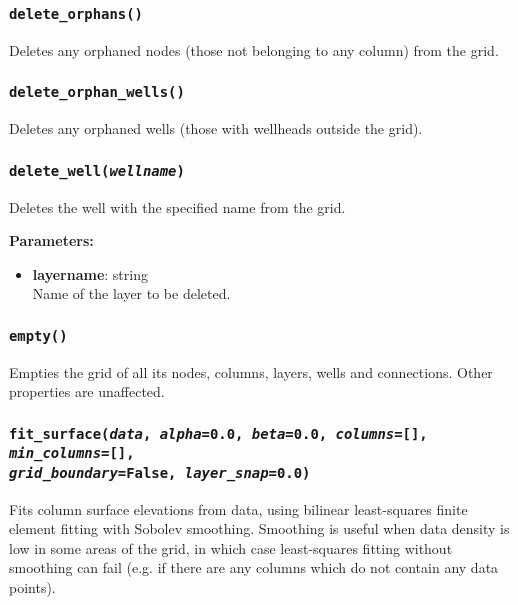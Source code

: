 \subsubsection{\texttt{delete\_orphans()}}

Deletes any orphaned nodes (those not belonging to any column) from the grid.

\subsubsection{\texttt{delete\_orphan\_wells()}}

Deletes any orphaned wells (those with wellheads outside the grid).

\subsubsection{\texttt{delete\_well(\emph{wellname})}}

Deletes the well with the specified name from the grid.

\textbf{Parameters:}
\begin{itemize}
\item \textbf{layername}: string\\
  Name of the layer to be deleted.
\end{itemize}

\subsubsection{\texttt{empty()}}

Empties the grid of all its nodes, columns, layers, wells and connections.  Other properties are unaffected.

\subsubsection{\texttt{fit\_surface(\emph{data}, \emph{alpha}=0.0, \emph{beta}=0.0, \emph{columns}=[], \emph{min\_columns}=[], \\
    \emph{grid\_boundary}=False, \emph{layer\_snap}=0.0)}}

Fits column surface elevations from data, using bilinear least-squares finite element fitting with Sobolev smoothing.  Smoothing is useful when data density is low in some areas of the grid, in which case least-squares fitting without smoothing can fail (e.g. if there are any columns which do not contain any data points).

